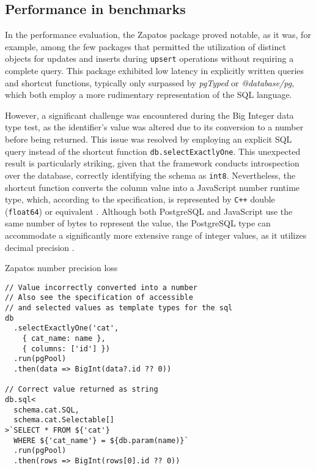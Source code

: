 \subsection*{Performance in benchmarks}

In the performance evaluation, the Zapatos package proved notable, as it was,
for example, among the few packages that permitted the utilization of distinct
objects for updates and inserts during \texttt{upsert} operations without
requiring a complete query. This package exhibited low latency in explicitly
written queries and shortcut functions, typically only surpassed by
\textit{pgTyped} or \textit{@database/pg}, which both employ a more rudimentary
representation of the SQL language.

However, a significant challenge was encountered during the Big Integer data
type test, as the identifier's value was altered due to its conversion to a
number before being returned. This issue was resolved by employing an explicit
SQL query instead of the shortcut function \texttt{db.selectExactlyOne}. This
unexpected result is particularly striking, given that the framework conducts
introspection over the database, correctly identifying the schema as
\texttt{int8}. Nevertheless, the shortcut function converts the column value
into a JavaScript number runtime type, which, according to the specification, is
represented by \texttt{C++} double (\texttt{float64}) or equivalent
\cite{MDNNumber}. Although both PostgreSQL and JavaScript use the same number of
bytes to represent the value, the PostgreSQL type can accommodate a
significantly more extensive range of integer values, as it utilizes decimal
precision \cite{PostgresNumeric}.

\begin{listing}
\caption{Zapatos number precision loss}

\begin{verbatim}
// Value incorrectly converted into a number
// Also see the specification of accessible 
// and selected values as template types for the sql
db
  .selectExactlyOne('cat', 
    { cat_name: name }, 
    { columns: ['id'] })
  .run(pgPool)
  .then(data => BigInt(data?.id ?? 0))

// Correct value returned as string
db.sql<
  schema.cat.SQL,
  schema.cat.Selectable[]
>`SELECT * FROM ${'cat'} 
  WHERE ${'cat_name'} = ${db.param(name)}`
  .run(pgPool)
  .then(rows => BigInt(rows[0].id ?? 0))
\end{verbatim}
\end{listing}

